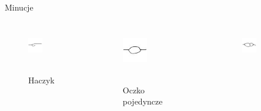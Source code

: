 \documentclass{beamer}
\begin{document}
\begin{frame}{Minucje}
    \begin{columns}
            \begin{figure}[t]
			    \centering
                \includegraphics[width=0.4\textwidth]{fingerprints/minucje/haczyk.jpg}\\~\
                \caption*{Haczyk}
            \end{figure}
		    \begin{figure}[t]
			    \centering
                \includegraphics[width=0.4\textwidth]{fingerprints/minucje/oczko1.jpg}\\~\
                 \caption*{Oczko pojedyncze}
            \end{figure}
        \column{0.25\textwidth}
            \begin{figure}[t]
			    \centering
                \includegraphics[width=0.4\textwidth]{fingerprints/minucje/oczko2.jpg}\\~\

\end{figure}
\end{columns}
\end{frame}
\end{document}
